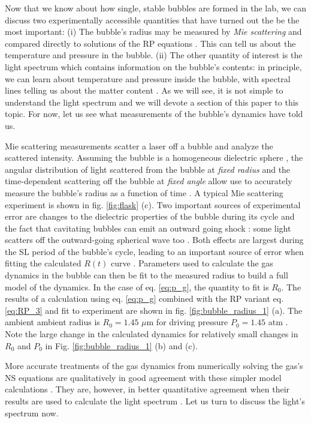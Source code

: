 \documentclass[prb,aps,nofootinbib,superscriptaddress,floatfix]{revtex4-2}
\begin{document}
Now that we know about how single, stable bubbles are formed in the lab, we can discuss two experimentally accessible quantities that have turned out the be the most important: (i) The bubble's radius may be measured by \emph{Mie scattering} and compared directly to solutions of the RP equations \cite{}. This can tell us about the temperature and pressure in the bubble. (ii) The other quantity of interest is the light spectrum which contains information on the bubble's contents: in principle, we can learn about temperature and pressure inside the bubble, with spectral lines telling us about the matter content \cite{}. As we will see, it is not simple to understand the light spectrum \cite{} and we will devote a section of this paper to this topic. For now, let us see what measurements of the bubble's dynamics have told us. 

Mie scattering measurements scatter a laser off a bubble and analyze the scattered intensity. Assuming the bubble is a homogeneous dielectric sphere \cite{}, the angular distribution of light scattered from the bubble at \emph{fixed radius} and the time-dependent scattering off the bubble at \emph{fixed angle} allow use to accurately measure the bubble's radius as a function of time \cite{}. A typical Mie scattering experiment is shown in fig. \ref{fig:flask} (c). Two important sources of experimental error are changes to the dielectric properties of the bubble during its cycle \cite{} and the fact that cavitating bubbles can emit an outward going shock \cite{}: some light scatters off the outward-going spherical wave too \cite{}. Both effects are largest during the SL period of the bubble's cycle, leading to an important source of error when fitting the calculated $R(t)$ curve \cite{}. Parameters used to calculate the gas dynamics in the bubble can then be fit to the measured radius to build a full model of the dynamics. In the case of eq. \ref{eq:p_g}, the quantity to fit is $R_0$. The results of a calculation using eq. \ref{eq:p_g} combined with the RP variant eq. \ref{eq:RP_3} and fit to experiment are shown in fig. \ref{fig:bubble_radius_1} (a). The ambient ambient radius is $R_0=1.45$ $\mu$m for driving pressure $P_0=1.45$ atm \cite{barber1997defining,barber1992light}. Note the large change in the calculated dynamics for relatively small changes in $R_0$ and $P_0$ in Fig. \ref{fig:bubble_radius_1} (b) and (c). 

More accurate treatments of the gas dynamics from numerically solving the gas's NS equations are qualitatively in good agreement with these simpler model calculations \cite{brenner2002single,yasui2018acoustic}. They are, however, in better quantitative agreement when their results are used to calculate the light spectrum \cite{an2009diagnosing,an2008spectral,an2006mechanism,flannigan2005plasma,flannigan2006measurement,suslick2008inside}. Let us turn to discuss the light's spectrum now.
\end{document}
